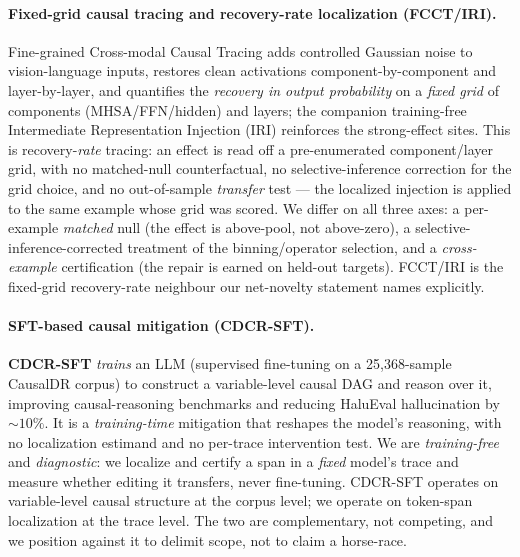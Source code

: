 \documentclass[11pt]{article}
\theoremstyle{plain}
\theoremstyle{definition}
\begin{document}
\paragraph{Fixed-grid causal tracing and recovery-rate localization (FCCT/IRI).}
Fine-grained Cross-modal Causal Tracing \cite{li2026fcct} adds controlled Gaussian
noise to vision-language inputs, restores clean activations component-by-component
and layer-by-layer, and quantifies the \emph{recovery in output probability} on a
\emph{fixed grid} of components (MHSA/FFN/hidden) and layers; the companion
training-free Intermediate Representation Injection (IRI) reinforces the
strong-effect sites. This is recovery-\emph{rate} tracing: an effect is read off a
pre-enumerated component/layer grid, with no matched-null counterfactual, no
selective-inference correction for the grid choice, and no out-of-sample
\emph{transfer} test --- the localized injection is applied to the same example
whose grid was scored. We differ on all three axes: a per-example \emph{matched}
null (the effect is above-pool, not above-zero), a selective-inference-corrected
treatment of the binning/operator selection, and a \emph{cross-example}
certification (the repair is earned on held-out targets). FCCT/IRI is the
fixed-grid recovery-rate neighbour our net-novelty statement names explicitly.

\paragraph{SFT-based causal mitigation (CDCR-SFT).} \textbf{CDCR-SFT}
\cite{li2026cdcrsft} \emph{trains} an LLM (supervised fine-tuning on a 25{,}368-sample
CausalDR corpus) to construct a variable-level causal DAG and reason over it,
improving causal-reasoning benchmarks and reducing HaluEval hallucination by
$\sim 10\%$. It is a \emph{training-time} mitigation that reshapes the model's
reasoning, with no localization estimand and no per-trace intervention test. We are
\emph{training-free} and \emph{diagnostic}: we localize and certify a span in a
\emph{fixed} model's trace and measure whether editing it transfers, never
fine-tuning. CDCR-SFT operates on variable-level causal structure at the corpus
level; we operate on token-span localization at the trace level. The two are
complementary, not competing, and we position against it to delimit scope, not to
claim a horse-race.
\end{document}
